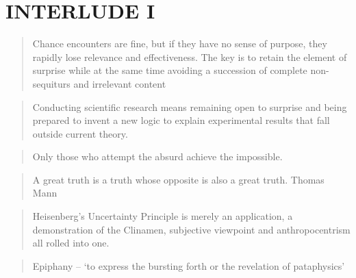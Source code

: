 
\pagestyle{empty}

\chapter*{INTERLUDE I}
\label{interlude1}



\begin{quote}
    Chance encounters are fine, but if they have no sense of purpose, they rapidly lose relevance and effectiveness. The key is to retain the element of surprise while at the same time avoiding a succession of complete non-sequiturs and irrelevant content 
\end{quote}

\begin{quote}
    Conducting scientific research means remaining open to surprise and being prepared to invent a new logic to explain experimental results that fall outside current theory. 
\end{quote}

\begin{quote}
    Only those who attempt the absurd achieve the impossible. 
\end{quote}

\begin{quote}
    A great truth is a truth whose opposite is also a great truth. Thomas Mann 
\end{quote}

\begin{quote}
    Heisenberg's Uncertainty Principle is merely an application, a demonstration of the Clinamen, subjective viewpoint and anthropocentrism all rolled into one. 
\end{quote}

\begin{quotation}
  Epiphany – `to express the bursting forth or the revelation of pataphysics' 
\end{quotation}

\clearpage